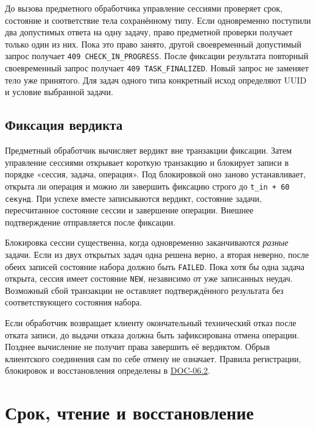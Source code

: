 \documentclass[12pt,a4paper]{article}
\begin{document}
До вызова предметного обработчика управление сессиями проверяет срок, состояние и соответствие тела сохранённому типу. Если одновременно поступили два допустимых ответа на одну задачу, право предметной проверки получает только один из них. Пока это право занято, другой своевременный допустимый запрос получает \texttt{409 CHECK\_\allowbreak{}IN\_\allowbreak{}PROGRESS}. После фиксации результата повторный своевременный запрос получает \texttt{409 TASK\_\allowbreak{}FINALIZED}. Новый запрос не заменяет тело уже принятого. Для задач одного типа конкретный исход определяют UUID и условие выбранной задачи.

\subsection{Фиксация вердикта}\label{ux444ux438ux43aux441ux430ux446ux438ux44f-ux432ux435ux440ux434ux438ux43aux442ux430}

\hypertarget{фиксация-вердикта}{}

Предметный обработчик вычисляет вердикт вне транзакции фиксации. Затем управление сессиями открывает короткую транзакцию и блокирует записи в порядке «сессия, задача, операция». Под блокировкой оно заново устанавливает, открыта ли операция и можно ли завершить фиксацию строго до \texttt{t\_\allowbreak{}in + 60 секунд}. При успехе вместе записываются вердикт, состояние задачи, пересчитанное состояние сессии и завершение операции. Внешнее подтверждение отправляется после фиксации.

Блокировка сессии существенна, когда одновременно заканчиваются \emph{разные} задачи. Если из двух открытых задач одна решена верно, а вторая неверно, после обеих записей состояние набора должно быть \texttt{FAILED}. Пока хотя бы одна задача открыта, сессия имеет состояние \texttt{NEW}, независимо от уже записанных неудач. Возможный сбой транзакции не оставляет подтверждённого результата без соответствующего состояния набора.

Если обработчик возвращает клиенту окончательный технический отказ после отката записи, до выдачи отказа должна быть зафиксирована отмена операции. Позднее вычисление не получит права завершить её вердиктом. Обрыв клиентского соединения сам по себе отмену не означает. Правила регистрации, блокировок и восстановления определены в {\href{../07\_Программные\_требования/DOC-06.2\_Сессии\_задач\_и\_планировщик.pdf\#3-обработка-ответа}{DOC-06.2}}.

\section{Срок, чтение и восстановление}\label{5-ux441ux440ux43eux43a-ux447ux442ux435ux43dux438ux435-ux438-ux432ux43eux441ux441ux442ux430ux43dux43eux432ux43bux435ux43dux438ux435}
\end{document}
